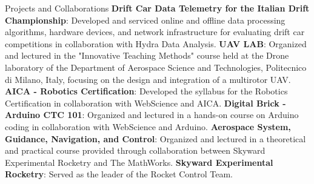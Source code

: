 \begin{rubric}{Projects and Collaborations}
\entry*[2021 -- Present] \textbf{Drift Car Data Telemetry for the Italian Drift Championship}: Developed and serviced online and offline data processing algorithms, hardware devices, and network infrastructure for evaluating drift car competitions in collaboration with Hydra Data Analysis.
%
\entry*[2018 - 2019] \textbf{UAV LAB}: Organized and lectured in the "Innovative Teaching Methods" course held at the Drone laboratory of the Department of Aerospace Science and Technologies, Politecnico di Milano, Italy, focusing on the design and integration of a multirotor UAV.
%
\entry*[2018] \textbf{AICA - Robotics Certification}: Developed the syllabus for the Robotics Certification in collaboration with WebScience and AICA.
%
\entry*[2017] \textbf{Digital Brick - Arduino CTC 101}: Organized and lectured in a hands-on course on Arduino coding in collaboration with WebScience and Arduino.
%
\entry*[2014] \textbf{Aerospace System, Guidance, Navigation, and Control}: Organized and lectured in a theoretical and practical course provided through collaboration between Skyward Experimental Rocketry and The MathWorks.
%
\entry*[2013 -- 2015] \textbf{Skyward Experimental Rocketry}: Served as the leader of the Rocket Control Team.
\end{rubric}
